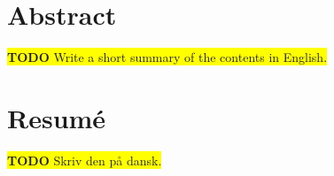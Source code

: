 \begingroup
\let\clearpage\relax
\let\cleardoublepage\relax
\let\cleardoublepage\relax

\chapter*{Abstract}
\colorbox{yellow}{\textbf{TODO} Write a short summary of the contents in English.}

\vfill

\chapter*{Resumé}
\colorbox{yellow}{\textbf{TODO} Skriv den på dansk.}


\endgroup			

\vfill